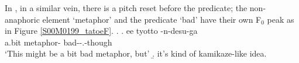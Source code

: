 In \Next,
in a similar vein,
there is a pitch reset before the predicate;
the non-anaphoric element  `metaphor' and the predicate  `bad' have their own F$_{0}$ peak as in Figure \ref{S00M0199_tatoeF}.
%
\ex.\label{S00M0199_tatoe}
 \ag. ee tyotto \tp{\dvline}  \tp{\dvline} -n-desu-ga \tp{\dvline} \\
 		 a.bit {} metaphor- {} bad--.-though {} \\
		`This might be a bit bad metaphor, but'
 \b. it's kind of kamikaze-like idea.

